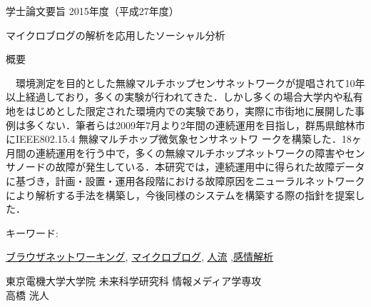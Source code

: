 \newpage
\pagestyle{plain}
\begin{center}
\LARGE{学士論文要旨 \hspace{10mm} 2015年度（平成27年度）}\\

\vspace{10mm}

\LARGE{マイクロブログの解析を応用したソーシャル分析}\\
\end{center}

\begin{center}
概要\\
\end{center}

　環境測定を目的とした無線マルチホップセンサネットワークが提唱されて10年以上経過しており，多くの実験が行われてきた．しかし多くの場合大学内や私有地をはじめとした限定された環境内での実験であり，実際に市街地に展開した事例は多くない．筆者らは2009年7月より2年間の連続運用を目指し，群馬県館林市にIEEE802.15.4 無線マルチホップ微気象センサネットワ ークを構築した．18ヶ月間の連続運用を行う中で，多くの無線マルチホップネットワークの障害やセンサノードの故障が発生している．本研究では，連続運用中に得られた故障データに基づき，計画・設置・運用各段階における故障原因をニューラルネットワークにより解析する手法を構築し，今後同様のシステムを構築する際の指針を提案した．

\begin{flushleft}キーワード:\\
\end{flushleft}
{\underline{ブラウザネットワーキング}, \underline{マイクロブログ}, \underline{人流} ,\underline{感情解析} }


\begin{center}
\vspace{10mm}
\begin{flushright}\large 東京電機大学大学院 未来科学研究科 情報メディア学専攻\\
\LARGE 高橋 洸人\\
\end{flushright}
\end{center}

\newpage


